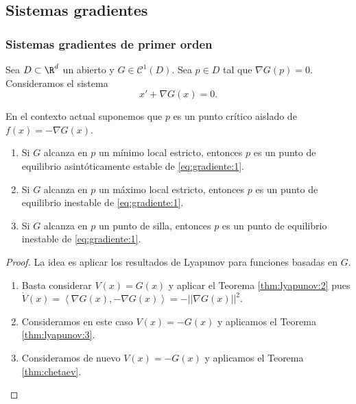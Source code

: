 \subsection{Sistemas gradientes}


\subsubsection{Sistemas gradientes de primer orden}

Sea $D \subset \R^d$ un abierto y $G \in \mathcal{C}^1(D)$. Sea $p \in D$ tal que $\nabla G(p) =
0$. Consideramos el sistema
\begin{equation}
  \label{eq:gradiente:1}
  x' + \nabla G (x) = 0.
  \tag{G1}
\end{equation}

\begin{proposition} \label{prop:gradiente:1} En el contexto actual suponemos que $p$ es un punto
  crítico aislado de $f(x) = - \nabla G(x)$.
  \begin{enumerate}
  \item Si $G$ alcanza en $p$ un mínimo local estricto, entonces $p$ es un punto de equilibrio
    asintóticamente estable de \eqref{eq:gradiente:1}.
  \item Si $G$ alcanza en $p$ un máximo local estricto, entonces $p$ es un punto de equilibrio
    inestable de \eqref{eq:gradiente:1}.
  \item Si $G$ alcanza en $p$ un punto de silla, entonces $p$ es un punto de equilibrio inestable de
    \eqref{eq:gradiente:1}.
  \end{enumerate}
\end{proposition}
\begin{proof}
  La idea es aplicar los resultados de Lyapunov para funciones basadas en $G$.
  
  \begin{enumerate}
  \item Basta considerar $V(x) = G(x)$ y aplicar el Teorema \ref{thm:lyapunov:2} pues
    $\dot{V}(x) = \left\langle \nabla G(x), -\nabla G(x) \right\rangle = - ||\nabla G(x)||^2$.
  \item Consideramos en este caso $V(x) = - G(x)$ y aplicamos el Teorema \ref{thm:lyapunov:3}.
  \item Consideramos de nuevo $V(x) = - G(x)$ y aplicamos el Teorema \ref{thm:chetaev}. \qedhere
  \end{enumerate}
\end{proof}

